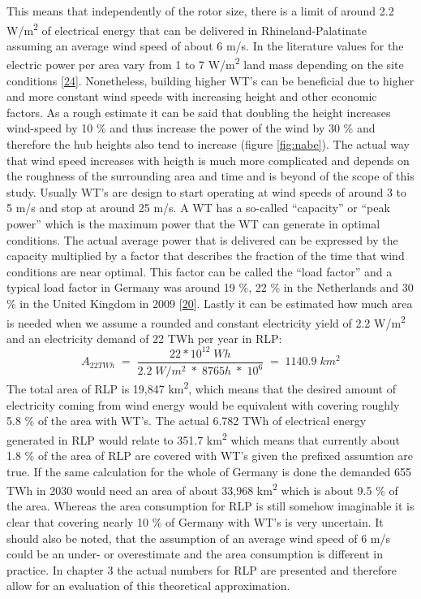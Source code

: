 \documentclass[a4paper,11pt]{article}
\begin{document}
This means that independently of the rotor size, there is a limit of around 2.2 W/m\textsuperscript{2} of electrical energy that can be delivered in Rhineland-Palatinate assuming an average wind speed of about 6 m/s. In the literature values for the electric power per area vary from 1 to 7 W/m\textsuperscript{2} land mass depending on the site conditions {[}\protect\hyperlink{ref-SvenLinow.2020}{24}{]}. Nonetheless, building higher WT's can be beneficial due to higher and more constant wind speeds with increasing height and other economic factors. As a rough estimate it can be said that doubling the height increases wind-speed by 10 \% and thus increase the power of the wind by 30 \% and therefore the hub heights also tend to increase (figure \ref{fig:nabe}). The actual way that wind speed increases with heigth is much more complicated and depends on the roughness of the surrounding area and time and is beyond of the scope of this study. Usually WT's are design to start operating at wind speeds of around 3 to 5 m/s and stop at around 25 m/s. A WT has a so-called ``capacity'' or ``peak power'' which is the maximum power that the WT can generate in optimal conditions. The actual average power that is delivered can be expressed by the capacity multiplied by a factor that describes the fraction of the time that wind conditions are near optimal. This factor can be called the ``load factor'' and a typical load factor in Germany was around 19 \%, 22 \% in the Netherlands and 30 \% in the United Kingdom in 2009 {[}\protect\hyperlink{ref-DavidJCMacKay.2009}{20}{]}. Lastly it can be estimated how much area is needed when we assume a rounded and constant electricity yield of 2.2 W/m\textsuperscript{2} and an electricity demand of 22 TWh per year in RLP:
\begin{equation}
A_{22TWh}\;=\;\frac{22 * 10^{12}\; Wh}{2.2\;W/m^2\; *\; 8765h\; *\; 10^6}\;=\;1140.9\;km^2
\end{equation}
The total area of RLP is 19,847 km\textsuperscript{2}, which means that the desired amount of electricity coming from wind energy would be equivalent with covering roughly 5.8 \% of the area with WT's. The actual 6.782 TWh of electrical energy generated in RLP would relate to 351.7 km\textsuperscript{2} which means that currently about 1.8 \% of the area of RLP are covered with WT's given the prefixed assumtion are true. If the same calculation for the whole of Germany is done the demanded 655 TWh in 2030 would need an area of about 33,968 km\textsuperscript{2} which is about 9.5 \% of the area. Whereas the area consumption for RLP is still somehow imaginable it is clear that covering nearly 10 \% of Germany with WT's is very uncertain. It should also be noted, that the assumption of an average wind speed of 6 m/s could be an under- or overestimate and the area consumption is different in practice. In chapter 3 the actual numbers for RLP are presented and therefore allow for an evaluation of this theoretical approximation.
\end{document}
